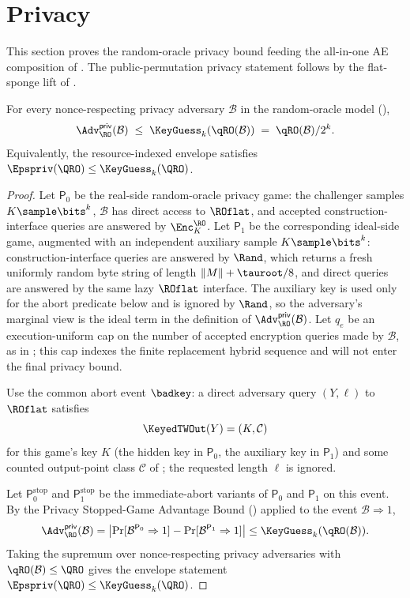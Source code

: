 \section{Privacy}
\label{sec:privacy}

This section proves the random-oracle privacy bound feeding the
all-in-one AE composition of . The public-permutation
privacy statement follows by the flat-sponge lift of
.

\begin{theorem}
\label{thm:priv-ro}
For every nonce-respecting privacy adversary $\mathcal{B}$ in the
\TW{} random-oracle model (),
\[
  \Adv^{\mathsf{priv}}_\RO(\mathcal{B})
  \;\leq\; \KeyGuess_k(\qRO(\mathcal{B}))
  \;=\; \qRO(\mathcal{B}) / 2^k.
\]
Equivalently, the resource-indexed envelope satisfies $\Epspriv(\QRO)
\leq \KeyGuess_k(\QRO)$.
\end{theorem}

\begin{proof}
Let $\mathsf{P}_0$ be the real-side random-oracle privacy game: the
challenger samples $K \sample \bits^k$, $\mathcal{B}$ has direct access
to $\ROflat$, and accepted construction-interface queries are answered
by $\Enc_K^\RO$. Let $\mathsf{P}_1$ be the corresponding ideal-side
game, augmented with an independent auxiliary sample
$K \sample \bits^k$: construction-interface queries are answered by
$\Rand$, which returns a fresh uniformly random byte string of length
$\|M\| + \tauroot/8$, and direct queries are answered by the same lazy
$\ROflat$ interface. The auxiliary key is used only for the abort
predicate below and is ignored by $\Rand$, so the adversary's marginal
view is the ideal term in the definition of
$\Adv^{\mathsf{priv}}_\RO(\mathcal{B})$.
Let $q_e$ be an execution-uniform cap on the number of accepted
encryption queries made by $\mathcal{B}$, as in
; this cap indexes the finite replacement
hybrid sequence and will not enter the final privacy bound.

Use the common abort event $\badkey$: a direct
adversary query $(Y,\ell)$ to $\ROflat$ satisfies
\[
  \KeyedTWOut(Y) = (K,\mathcal{C})
\]
for this game's key $K$ (the hidden key in $\mathsf{P}_0$, the
auxiliary key in $\mathsf{P}_1$) and some counted output-point class
$\mathcal{C}$ of ; the requested length $\ell$ is
ignored.

Let $\mathsf{P}_0^{\mathrm{stop}}$ and
$\mathsf{P}_1^{\mathrm{stop}}$ be the immediate-abort variants of
$\mathsf{P}_0$ and $\mathsf{P}_1$ on this event. By the Privacy
Stopped-Game Advantage Bound () applied to
the event $\mathcal{B} \Rightarrow 1$,
\[
  \Adv^{\mathsf{priv}}_\RO(\mathcal{B})
  =
  \bigl|
    \Pr[\mathcal{B}^{\mathsf{P}_0} \Rightarrow 1]
    - \Pr[\mathcal{B}^{\mathsf{P}_1} \Rightarrow 1]
  \bigr|
  \leq \KeyGuess_k(\qRO(\mathcal{B})).
\]
Taking the supremum over nonce-respecting privacy adversaries with
$\qRO(\mathcal{B}) \leq \QRO$ gives the envelope statement
$\Epspriv(\QRO) \leq \KeyGuess_k(\QRO)$.
\end{proof}

